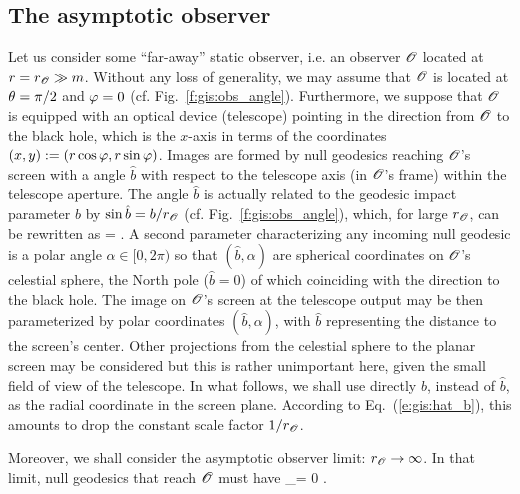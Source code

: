 \subsection{The asymptotic observer} \label{s:gis:asympt_obs}

Let us consider some ``far-away'' static observer, i.e.
an observer $\mathscr{O}$ located at $r = r_{\mathscr{O}} \gg m$. Without
any loss of generality, we may assume that $\mathscr{O}$ is located at $\theta=\pi/2$ and $\varphi=0$
(cf. Fig.~\ref{f:gis:obs_angle}).
Furthermore, we suppose that $\mathscr{O}$ is
equipped with an optical device (telescope) pointing in the direction from $\mathscr{O}$ to the black hole, which
is the $x$-axis in terms of the coordinates $(x,y):=(r\cos\varphi,r\sin\varphi)$.
Images are formed by null geodesics reaching $\mathscr{O}$'s screen with a angle
$\hat{b}$ with respect to the telescope axis (in $\mathscr{O}$'s frame) within the
telescope aperture. The angle $\hat{b}$ is actually
related to the geodesic impact parameter $b$ by
$\sin\hat{b} = b / r_{\mathscr{O}}$ (cf. Fig.~\ref{f:gis:obs_angle}), which,
for large $r_{\mathscr{O}}$, can be rewritten as
\be \label{e:gis:hat_b}
     =  .
\ee
A second parameter characterizing any incoming null geodesic is a polar
angle $\alpha\in{[0, 2\pi)}$ so that $(\hat{b},\alpha)$ are spherical
coordinates on $\mathscr{O}$'s celestial sphere, the North pole ($\hat{b}=0$) of which
coinciding with the direction to the black hole. The image on $\mathscr{O}$'s screen
at the telescope output may be then parameterized by polar coordinates $(\hat{b}, \alpha)$, with $\hat{b}$ representing the distance to the screen's center.
Other projections from the celestial sphere to the planar screen may be considered
but this is rather unimportant here, given the small field of view of the telescope.
In what follows, we shall use directly $b$, instead of $\hat{b}$, as
the radial coordinate in the screen plane. According to Eq.~(\ref{e:gis:hat_b}),
this amounts to drop the constant
scale factor $1/r_{\mathscr{O}}$.

Moreover, we shall consider the asymptotic observer limit: $r_{\mathscr{O}}\to\infty$.
In that limit, null geodesics that reach $\mathscr{O}$ must have
\be \label{e:gis:ph_inf_0_mod_2pi}
\ph_\infty = 0  \pi .
\ee

